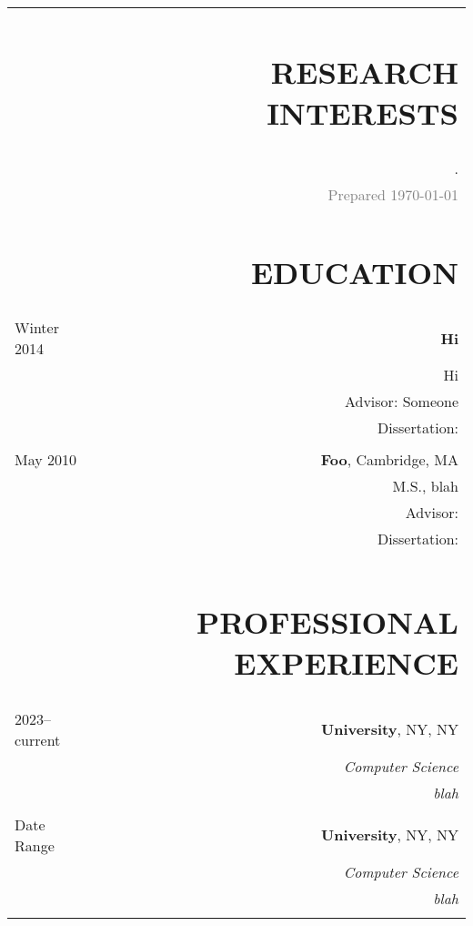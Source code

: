 \documentclass[10pt, line]{res}
\begin{document}
\thispagestyle{empty} %

\address{addr}




\begin{resume}

  \vspace{-4em}
\begin{longtable}{L R}
&\section{RESEARCH INTERESTS}\\
&.\\
&\textcolor{gray}{Prepared \today}\\

&\section{EDUCATION}\\
Winter 2014
           & {\bf Hi}\\
           & Hi\\ 
           & Advisor: Someone \\ 
           & Dissertation:  \\
           &\\
May 2010  
           & {\bf Foo}, Cambridge, MA\\
           & M.S., blah \\
           & Advisor:  \\
           & Dissertation: \\ \\


&\section{PROFESSIONAL EXPERIENCE}\\

2023--current 
           &{\bf University}, NY, NY\\
           &{\sl Computer Science}\\
           &{\sl blah}\\
           &\\
Date Range
           &{\bf University}, NY, NY\\
           &{\sl Computer Science}\\
           &{\sl blah}\\
           &\\



\end{longtable}
\end{resume}
\end{document}
